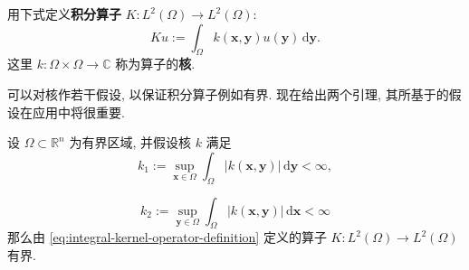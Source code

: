 \begin{Example}
\label{ex:integral-kernel-operator}
用下式定义\textbf{积分算子} $K:L^2(\Omega)\to L^2(\Omega)$:
\begin{equation}\label{eq:integral-kernel-operator-definition}
Ku:=\int_{\Omega}k(\bm{x},\bm{y})u(\bm{y})\,\mathrm{d}\bm{y}.
\end{equation}
这里 $k:\Omega\times\Omega\to\mathbb{C}$ 称为算子的\textbf{核}.

可以对核作若干假设, 以保证积分算子例如有界. 现在给出两个引理, 其所基于的假设在应用中将很重要.
\end{Example}

\begin{Lemma}
\label{lem:integral-kernel-row-column-boundedness}
设 $\Omega\subset\mathbb{R}^n$ 为有界区域, 并假设核 $k$ 满足
\begin{equation}\label{eq:integral-kernel-uniform-row-bound}
k_1:=\sup_{\bm{x}\in\Omega}\int_{\Omega}|k(\bm{x},\bm{y})|\,\mathrm{d}\bm{y}<\infty,
\end{equation}

\begin{equation}\label{eq:integral-kernel-uniform-column-bound}
k_2:=\sup_{\bm{y}\in\Omega}\int_{\Omega}|k(\bm{x},\bm{y})|\,\mathrm{d}\bm{x}<\infty
\end{equation}
那么由 \eqref{eq:integral-kernel-operator-definition} 定义的算子 $K:L^2(\Omega)\to L^2(\Omega)$ 有界.
\end{Lemma}

\begingroup
{}
\renewcommand{\endProof}{\par\nobreak\hfill$\blacksquare$\par\vspace{0.1cm}}
\endgroup


